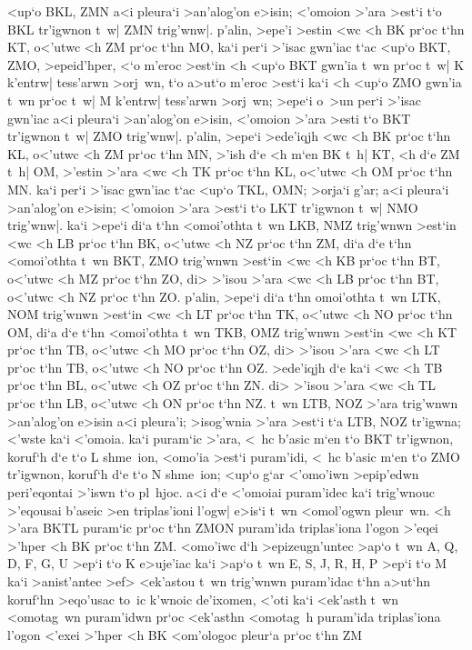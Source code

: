 \begin{Parallel}{}{}
{{<up`o BKL, ZMN a<i pleura`i >an'alog'on e>isin; <'omoion
>'ara >est`i t`o BKL tr'igwnon t~w| ZMN trig'wnw|. 
p'alin, >epe'i >estin <wc <h BK
pr`oc t`hn KT, o<'utwc <h ZM pr`oc t`hn MO, ka`i per`i >'isac gwn'iac t`ac <up`o
BKT, ZMO, >epeid'hper, <`o m'eroc >est`in <h <up`o BKT gwn'ia t~wn pr`oc
t~w| K k'entrw| tess'arwn >orj~wn, t`o a>ut`o m'eroc >est`i ka`i <h <up`o ZMO
gwn'ia t~wn pr`oc t~w| M k'entrw| tess'arwn >orj~wn; >epe`i o~>un per`i
>'isac gwn'iac a<i pleura`i >an'alog'on e>isin, <'omoion >'ara >esti t`o  BKT tr'igwnon
t~w| ZMO trig'wnw|. p'alin, >epe`i >ede'iqjh <wc <h BK pr`oc t`hn KL,
o<'utwc <h ZM pr`oc t`hn MN, >'ish d`e <h m`en BK t~h| KT, <h d`e ZM t~h|
OM, >'estin >'ara <wc <h TK pr`oc t`hn KL, o<'utwc <h OM pr`oc t`hn MN. ka`i
per`i >'isac gwn'iac t`ac <up`o TKL, OMN; >orja`i g'ar; a<i pleura`i >an'alog'on
e>isin; <'omoion >'ara >est`i t`o LKT tr'igwnon t~w| NMO trig'wnw|. ka`i
>epe`i di`a t`hn <omoi'othta t~wn LKB, NMZ trig'wnwn >est`in <wc <h LB
pr`oc t`hn BK, o<'utwc <h NZ pr`oc t`hn ZM, di`a d`e t`hn <omoi'othta t~wn 
BKT,
ZMO trig'wnwn >est`in <wc <h KB pr`oc t`hn BT, o<'utwc <h MZ pr`oc t`hn ZO,
di> >'isou >'ara <wc <h LB pr`oc t`hn BT, o<'utwc <h NZ pr`oc t`hn ZO. p'alin,
>epe`i di`a t`hn omoi'othta t~wn LTK, NOM trig'wnwn >est`in <wc <h LT pr`oc
t`hn TK, o<'utwc <h NO pr`oc t`hn OM, di`a d`e t`hn <omoi'othta t~wn TKB, OMZ
trig'wnwn >est`in <wc <h KT pr`oc t`hn TB, o<'utwc <h MO pr`oc t`hn OZ, di>
>'isou >'ara <wc <h LT pr`oc t`hn TB, o<'utwc <h NO pr`oc t`hn OZ. >ede'iqjh
d`e ka`i <wc <h TB pr`oc t`hn BL, o<'utwc <h OZ pr`oc t`hn ZN. di> >'isou
>'ara <wc <h TL pr`oc t`hn LB, o<'utwc <h ON pr`oc t`hn NZ. t~wn LTB, NOZ
>'ara trig'wnwn >an'alog'on e>isin a<i pleura'i; >isog'wnia >'ara >est`i t`a LTB, NOZ
tr'igwna; <'wste ka`i <'omoia. ka`i puram`ic >'ara, <~hc b'asic m`en t`o BKT tr'igwnon,
koruf`h d`e t`o L shme~ion, <omo'ia >est`i puram'idi, <~hc b'asic m`en t`o ZMO
tr'igwnon, koruf`h d`e t`o N shme~ion; <up`o g`ar <'omo'iwn >epip'edwn peri'eqontai
>'iswn t`o pl~hjoc. a<i d`e <'omoiai puram'idec ka`i trig'wnouc >'eqousai b'aseic
>en triplas'ioni l'ogw| e>is`i t~wn <omol'ogwn pleur~wn. <h >'ara BKTL puram`ic
pr`oc t`hn ZMON puram'ida triplas'iona l'ogon >'eqei >'hper <h BK pr`oc 
t`hn ZM.
<omo'iwc d`h >epizeugn'untec >ap`o t~wn A, Q, D, F, G, U >ep`i t`o K e>uje'iac
ka`i >ap`o  t~wn E, S, J, R, H, P >ep`i t`o M ka`i >anist'antec >ef> <ek'astou
t~wn trig'wnwn puram'idac t`hn a>ut`hn koruf`hn >eqo'usac to~ic k'wnoic
de'ixomen, <'oti ka`i <ek'asth t~wn <omotag~wn puram'idwn pr`oc <ek'asthn <omotag~h
puram'ida triplas'iona l'ogon <'exei >'hper <h BK <om'ologoc pleur`a pr`oc t`hn ZM
}}
\end{Parallel}
